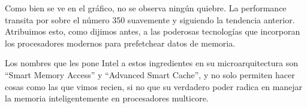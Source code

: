 Como bien se ve en el gráfico, no se observa ningún quiebre. La performance transita por sobre el número 350 suavemente y siguiendo la tendencia anterior. Atribuimos esto, como dijimos antes, a las poderosas tecnologías que incorporan los procesadores modernos para prefetchear datos de memoria.

Los nombres que les pone Intel a estos ingredientes en su microarquitectura son  ``Smart Memory Access'' y ``Advanced Smart Cache'', y no solo permiten hacer cosas como las que vimos recien, si no que su verdadero poder radica en manejar la memoria inteligentemente en procesadores multicore.






